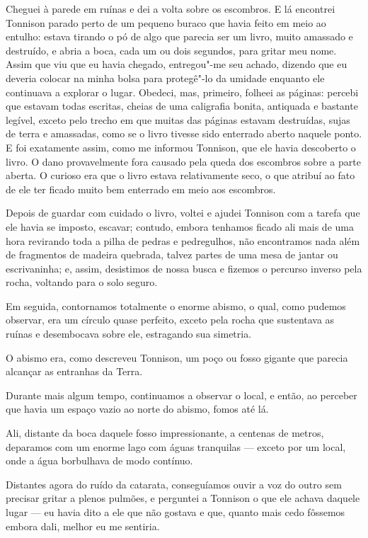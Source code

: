 Cheguei à parede em ruínas e dei a volta sobre os escombros. E lá encontrei Tonnison parado perto de um pequeno buraco
que havia feito em meio ao entulho: estava tirando o pó de algo que parecia ser um livro, muito amassado e destruído, e
abria a boca, cada um ou dois segundos, para gritar meu nome. Assim que viu que eu havia chegado, entregou"-me seu
achado, dizendo que eu deveria colocar na minha bolsa para protegê"-lo da umidade enquanto ele continuava a explorar o
lugar. Obedeci, mas, primeiro, folheei as páginas: percebi que estavam todas escritas, cheias de uma caligrafia bonita,
antiquada e bastante legível, exceto pelo trecho em que muitas das páginas estavam destruídas, sujas de terra e
amassadas, como se o livro tivesse sido enterrado aberto naquele ponto. E foi exatamente assim, como me informou
Tonnison, que ele havia descoberto o livro. O dano provavelmente fora causado pela queda dos escombros sobre a parte
aberta. O curioso era que o livro estava relativamente seco, o que atribuí ao fato de ele ter ficado muito bem
enterrado em meio aos escombros.

Depois de guardar com cuidado o livro, voltei e ajudei Tonnison com a tarefa que ele havia se imposto, escavar; contudo,
embora tenhamos ficado ali mais de uma hora revirando toda a pilha de pedras e pedregulhos, não encontramos nada além
de fragmentos de madeira quebrada, talvez partes de uma mesa de jantar ou escrivaninha; e, assim, desistimos de nossa
busca e fizemos o percurso inverso pela rocha, voltando para o solo seguro.

Em seguida, contornamos totalmente o enorme abismo, o qual, como pudemos observar, era um círculo quase perfeito, exceto
pela rocha que sustentava as ruínas e desembocava sobre ele, estragando sua simetria.

O abismo era, como descreveu Tonnison, um poço ou fosso gigante que parecia alcançar as entranhas da Terra.

Durante mais algum tempo, continuamos a observar o local, e então, ao perceber que havia um espaço vazio ao norte do
abismo, fomos até lá.

Ali, distante da boca daquele fosso impressionante, a centenas de metros, deparamos com um enorme lago com águas
tranquilas --- exceto por um local, onde a água borbulhava de modo contínuo.

Distantes agora do ruído da catarata, conseguíamos ouvir a voz do outro sem precisar gritar a plenos pulmões, e
perguntei a Tonnison o que ele achava daquele lugar --- eu havia dito a ele que não gostava e que, quanto mais cedo
fôssemos embora dali, melhor eu me sentiria.

